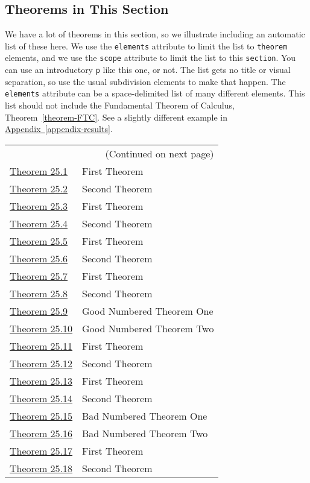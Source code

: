 \documentclass[10pt,]{article}
\theoremstyle{plain}
\theoremstyle{definition}
\theoremstyle{definition}
\theoremstyle{definition}
\theoremstyle{definition}
\theoremstyle{definition}
\theoremstyle{definition}
\numberwithin{equation}{section}
\begin{document}
\subsection[{Theorems in This Section}]{Theorems in This Section}\label{subsection-local-theorems}
\hypertarget{p-787}{}%
We have a lot of theorems in this section, so we illustrate including an automatic list of these here.  We use the \lstinline?elements? attribute to limit the list to \lstinline?theorem? elements, and we use the \lstinline?scope? attribute to limit the list to this \lstinline?section?.  You can use an introductory \lstinline?p? like this one, or not.  The list gets no title or visual separation, so use the usual subdivision elements to make that happen.  The \lstinline?elements? attribute can be a space-delimited list of many different elements.  This list should not include the Fundamental Theorem of Calculus, Theorem~\hyperref[theorem-FTC]{\ref{theorem-FTC}}.  See a slightly different example in \hyperref[appendix-results]{Appendix~\ref{appendix-results}}.%
\noindent
\begin{longtable}[l]{ll}
\endfirsthead
\endhead
\multicolumn{2}{r}{(Continued on next page)}\\
\endfoot
\endlastfoot
\hyperref[theorem-number-01]{Theorem 25.1}& First Theorem\\
\hyperref[theorem-number-02]{Theorem 25.2}& Second Theorem\\
\hyperref[theorem-number-03]{Theorem 25.3}& First Theorem\\
\hyperref[theorem-number-04]{Theorem 25.4}& Second Theorem\\
\hyperref[theorem-number-05]{Theorem 25.5}& First Theorem\\
\hyperref[theorem-number-06]{Theorem 25.6}& Second Theorem\\
\hyperref[theorem-number-07]{Theorem 25.7}& First Theorem\\
\hyperref[theorem-number-08]{Theorem 25.8}& Second Theorem\\
\hyperref[theorem-good-one]{Theorem 25.9}& Good Numbered Theorem One\\
\hyperref[theorem-good-two]{Theorem 25.10}& Good Numbered Theorem Two\\
\hyperref[theorem-number-09]{Theorem 25.11}& First Theorem\\
\hyperref[theorem-number-10]{Theorem 25.12}& Second Theorem\\
\hyperref[theorem-number-11]{Theorem 25.13}& First Theorem\\
\hyperref[theorem-number-12]{Theorem 25.14}& Second Theorem\\
\hyperref[theorem-bad-one]{Theorem 25.15}& Bad Numbered Theorem One\\
\hyperref[theorem-bad-two]{Theorem 25.16}& Bad Numbered Theorem Two\\
\hyperref[theorem-number-13]{Theorem 25.17}& First Theorem\\
\hyperref[theorem-number-14]{Theorem 25.18}& Second Theorem\\
\end{longtable}
\typeout{************************************************}
\typeout{Subsection 25.7 A Title with ] a Right Bracket}
\typeout{************************************************}
\end{document}
